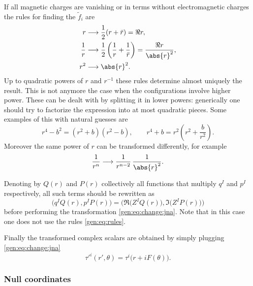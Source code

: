 If all magnetic charges are vanishing or in terms without electromagnetic charges the rules for finding the $\tilde f_i$ are
\begin{subequations}
\label{gen:eq:rules}
\begin{align}
	\label{gen:eq:rules:r}
	r & \longrightarrow \frac{1}{2} (r + \bar r) = \Re r, \\
	\label{gen:eq:rules:1/r}
	\frac{1}{r} & \longrightarrow \frac{1}{2} \left(\frac{1}{r} + \frac{1}{\bar r}\right) = \frac{\Re r}{\abs{r}^2}, \\
	\label{gen:eq:rules:r2}
	r^2 & \longrightarrow \abs{r}^2.
\end{align}
\end{subequations}
Up to quadratic powers of $r$ and $r^{-1}$ these rules determine almost uniquely the result.
This is not anymore the case when the configurations involve higher power.
These can be dealt with by splitting it in lower powers: generically one should try to factorize the expression into at most quadratic pieces.
Some examples of this with natural guesses are
\begin{equation}
	r^4 - b^2 = (r^2 + b) (r^2 - b), \qquad
	r^4 + b = r^2 \left( r^2 + \frac{b}{r^2} \right).
\end{equation} 
Moreover the same power of $r$ can be transformed differently, for example
\begin{equation}
	\frac{1}{r^n} \longrightarrow \frac{1}{r^{n-2}}\, \frac{1}{\abs{r}^2}.
\end{equation} 

Denoting by $Q(r)$ and $P(r)$ collectively all functions that multiply $q^I$ and $p^I$ respectively, all such terms should be rewritten as
\begin{equation}
	\Big( q^I Q(r), p^I P(r) \Big) = \Big( \Re\big(Z^I Q(r)\big), \Im\big(Z^I P(r)\big) \Big)
\end{equation} 
before performing the transformation \eqref{gen:eq:change:jna}.
Note that in this case one does not use the rules \eqref{gen:eq:rules}.

Finally the transformed complex scalars are obtained by simply plugging \eqref{gen:eq:change:jna}
\begin{equation}
	\tau'^i(r', \theta) = \tau^i\big(r + i F(\theta)\big).
\end{equation} 


\subsubsection{Null coordinates}


